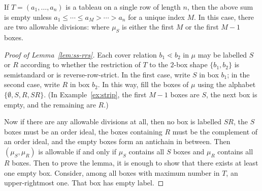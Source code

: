 \begin{exam}\label{ex:strip}
If $T = (a_1,\ldots,a_n)$ is a tableau on a single row of length $n$, then the above sum is empty unless $a_1 \le \cdots \le a_M > \cdots > a_n$ for a unique index $M$. In this case, there are two allowable divisions: where $\mu_S$ is either the first $M$ or the first $M-1$ boxes.
\end{exam}

\begin{proof}[Proof of Lemma~\ref{lem:ss-rrs}]
Each cover relation $b_1 \lessdot b_2$ in $\mu$ may be labelled $S$ or $R$ according to whether the restriction of $T$ to the $2$-box shape $\{b_1,b_2\}$ is semistandard or is reverse-row-strict. In the first case, write $S$ in box $b_1$; in the second case, write $R$ in box $b_2$. In this way, fill the boxes of $\mu$ using the alphabet $\{\emptyset, S, R, SR\}$. (In Example~\ref{ex:strip}, the first $M-1$ boxes are $S$, the next box is empty, and the remaining are $R$.) 

Now if there are any allowable divisions at all, then no box is labelled $SR$, the $S$ boxes must be an order ideal, the boxes containing $R$ must be the complement of an order ideal, and the empty boxes form an antichain in between. Then $(\mu_S,\mu_R)$ is allowable if and only if $\mu_S$ contains all $S$ boxes and $\mu_R$ contains all $R$ boxes. Then to prove the lemma, it is enough to show that there exists at least one empty box. Consider, among all boxes with maximum number in $T$, an upper-rightmost one. That box has empty label.
\end{proof}

